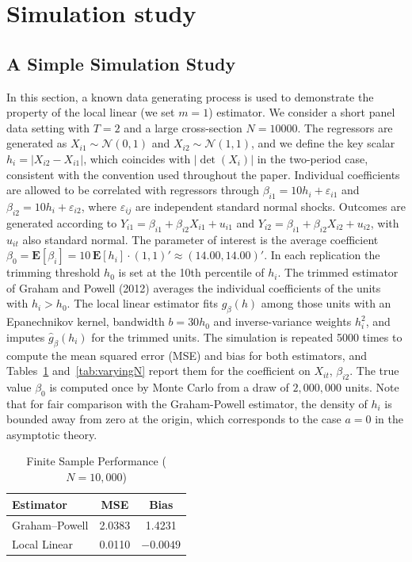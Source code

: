 \documentclass{article}
\begin{document}
\section{Simulation study}\label{sec:simulations}
\subsection{A Simple Simulation Study}\label{sec:simplesim}
In this section, a known data generating process is used to demonstrate the property of the local linear (we set $m=1$) estimator. We consider a short panel data setting with $T=2$ and a large cross-section $N=10000$. The regressors are generated as $X_{i1} \sim \mathcal{N}(0,1)$ and $X_{i2} \sim \mathcal{N}(1,1)$, and we define the key scalar $h_i = |X_{i2} - X_{i1}|$, which coincides with $|\det(X_i)|$ in the two-period case, consistent with the convention used throughout the paper. Individual coefficients are allowed to be correlated with regressors through $\beta_{i1} = 10h_i + \varepsilon_{i1}$ and $\beta_{i2} = 10h_i + \varepsilon_{i2}$, where $\varepsilon_{ij}$ are independent standard normal shocks. Outcomes are generated according to $Y_{i1} = \beta_{i1} + \beta_{i2}X_{i1} + u_{i1}$ and $Y_{i2} = \beta_{i1} + \beta_{i2}X_{i2} + u_{i2}$, with $u_{it}$ also standard normal. The parameter of interest is the average coefficient $\beta_0 = \mathbf{E}[\beta_i] = 10\,\mathbf{E}[h_i]\cdot(1,1)' \approx (14.00,14.00)'$. In each replication the trimming threshold $h_0$ is set at the 10th percentile of $h_i$. The trimmed estimator of Graham and Powell (2012) averages the individual coefficients of the units with $h_i>h_0$. The local linear estimator fits $g_\beta(h)$ among those units with an Epanechnikov kernel, bandwidth $b = 30h_0$ and inverse-variance weights $h_i^2$, and imputes $\hat g_\beta(h_i)$ for the trimmed units. The simulation is repeated 5000 times to compute the mean squared error (MSE) and bias for both estimators, and Tables~\ref{tab:simpleresult} and~\ref{tab:varyingN} report them for the coefficient on $X_{it}$, $\beta_{i2}$. The true value $\beta_0$ is computed once by Monte Carlo from a draw of $2{,}000{,}000$ units. Note that for fair comparison with the Graham-Powell estimator, the density of $h_i$ is bounded away from zero at the origin, which corresponds to the case $a=0$ in the asymptotic theory.

\begin{table}[ht]
\centering
\caption{Finite Sample Performance ($N=10{,}000$)}
\label{tab:simpleresult}
\begin{tabular}{lcc}
\hline\hline
Estimator & MSE & Bias \\
\hline
Graham--Powell & 2.0383 & 1.4231 \\
Local Linear   & 0.0110 & $-0.0049$ \\
\hline\hline
\end{tabular}
\end{table}
\end{document}
